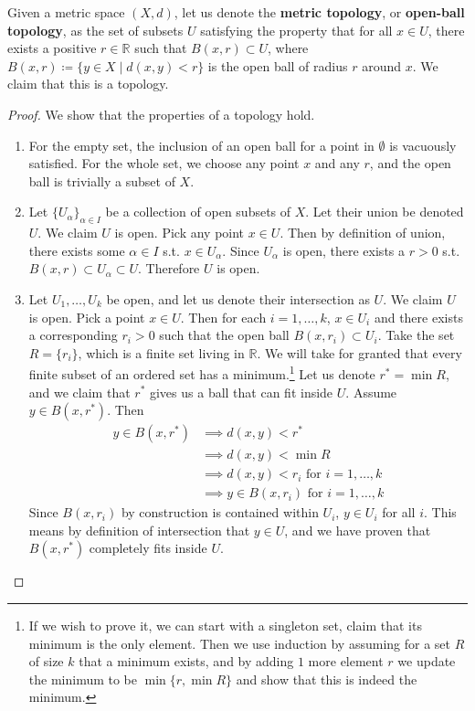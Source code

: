\documentclass{article}
\begin{document}
    \begin{theorem}
      Given a metric space $(X, d)$, let us denote the \textbf{metric topology}, or \textbf{open-ball topology}, as the set of subsets $U$ satisfying the property that for all $x \in U$, there exists a positive $r \in \mathbb{R}$ such that $B(x, r) \subset U$, where $B(x, r) \coloneqq \{y \in X \mid d(x, y) < r\}$ is the open ball of radius $r$ around $x$. We claim that this is a topology. 
    \end{theorem} 
    \begin{proof}
      We show that the properties of a topology hold. 
      \begin{enumerate} 
        \item For the empty set, the inclusion of an open ball for a point in $\emptyset$ is vacuously satisfied. For the whole set, we choose any point $x$ and any $r$, and the open ball is trivially a subset of $X$. 

        \item Let $\{U_\alpha\}_{\alpha \in I}$ be a collection of open subsets of $X$. Let their union be denoted $U$. We claim $U$ is open. Pick any point $x \in U$. Then by definition of union, there exists some $\alpha \in I$ s.t. $x \in U_\alpha$. Since $U_\alpha$ is open, there exists a $r > 0$ s.t. $B(x, r) \subset U_\alpha \subset U$. Therefore $U$ is open. 

        \item Let $U_1, \ldots, U_k$ be open, and let us denote their intersection as $U$. We claim $U$ is open. Pick a point $x \in U$. Then for each $i = 1, \ldots, k$, $x \in U_i$ and there exists a corresponding $r_i > 0$  such that the open ball $B(x, r_i) \subset U_i$. Take the set $R = \{r_i\}$, which is a finite set living in $\mathbb{R}$. We will take for granted that every finite subset of an ordered set has a minimum.\footnote{If we wish to prove it, we can start with a singleton set, claim that its minimum is the only element. Then we use induction by assuming for a set $R$ of size $k$ that a minimum exists, and by adding $1$ more element $r$ we update the minimum to be $\min\{r, \min{R}\}$ and show that this is indeed the minimum.} Let us denote $r^\ast = \min{R}$, and we claim that $r^\ast$ gives us a ball that can fit inside $U$. Assume $y \in B(x, r^\ast)$. Then 
        \begin{align}
          y \in B(x, r^\ast) & \implies d(x, y) < r^\ast \\ 
                             & \implies d(x, y) < \min{R} \\
                             & \implies d(x, y) < r_i \text{ for } i = 1, \ldots, k \\
                             & \implies y \in B(x, r_i) \text{ for } i = 1, \ldots, k
        \end{align} 
        Since $B(x, r_i)$ by construction is contained within $U_i$, $y \in U_i$ for all $i$. This means by definition of intersection that $y \in U$, and we have proven that $B(x, r^\ast)$ completely fits inside $U$. 
      \end{enumerate}
    \end{proof} 
\end{document}
